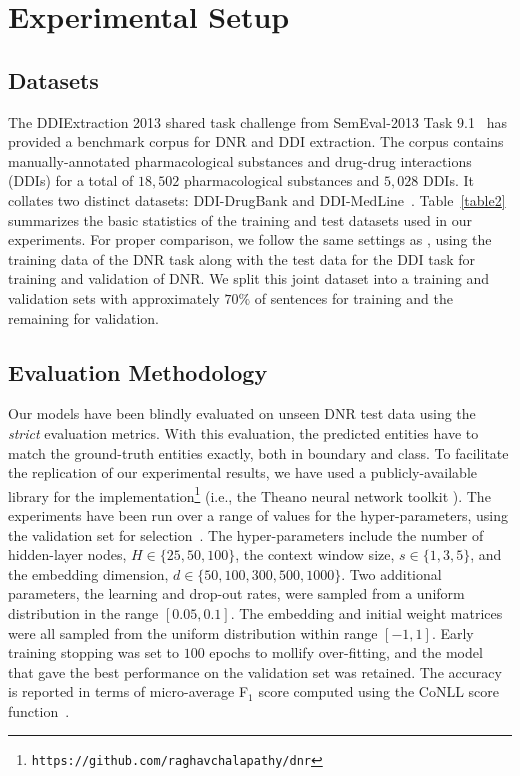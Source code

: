\section{Experimental Setup}  \label{sec:experiment-setup}
\subsection{Datasets}
The DDIExtraction 2013 shared task challenge from SemEval-2013 Task 9.1~\cite{segura2013semeval} has provided a benchmark corpus for DNR and DDI extraction. The corpus contains manually-annotated pharmacological substances and drug-drug interactions (DDIs) for a total of $18,502$ pharmacological substances and $5,028$ DDIs. It collates two distinct datasets: DDI-DrugBank and DDI-MedLine~\cite{herrero2013ddi}. Table~\ref{table2} summarizes the basic statistics of the training and test datasets used in our experiments. For proper comparison, we follow the same settings as \cite{segura2015exploring}, using the training data of the DNR task along with the test data for the DDI task for training and validation of DNR. We split this joint dataset into a training and validation sets with approximately $70\%$ of sentences for training and the remaining for validation.

\subsection{Evaluation Methodology}
Our models have been blindly evaluated on unseen DNR test data using the \textit{strict} evaluation metrics. With this evaluation, the predicted entities have to match the ground-truth entities exactly, both in boundary and class. To facilitate the replication of our experimental results, we have used a publicly-available library for the implementation\footnote{\tt https://github.com/raghavchalapathy/dnr} (i.e., the Theano neural network toolkit \cite{bergstra2010theano}). The experiments have been run over a range of values for the hyper-parameters, using the validation set for selection~\cite{bergstra2012random}. The hyper-parameters include the number of hidden-layer nodes, $H \in \{25, 50, 100\}$, the context window size, $s \in \{1, 3, 5\}$, and the embedding dimension, $d \in \{50, 100, 300, 500, 1000\}$. Two additional parameters, the learning and drop-out rates, were sampled from a uniform distribution in the range $[0.05, 0.1]$. The embedding and initial weight matrices were all sampled from the uniform distribution within range $[-1, 1]$. Early training stopping was set to $100$ epochs to mollify over-fitting, and the model that gave the best performance on the validation set was retained. The accuracy is reported in terms of micro-average F$_1$ score computed using the CoNLL score function~\cite{Nadeau:07}.

